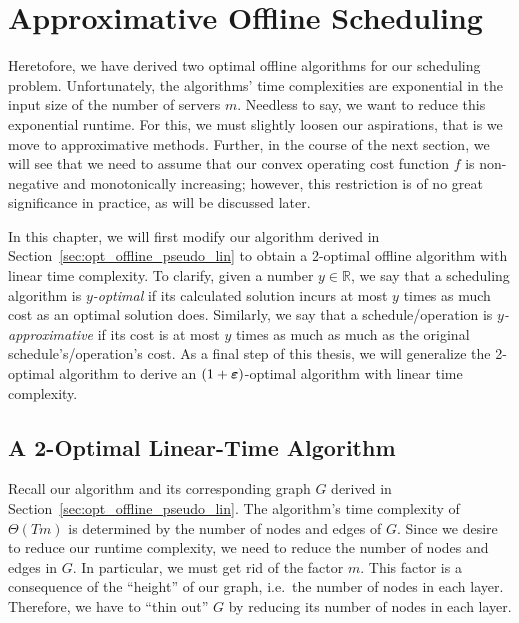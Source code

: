 
\chapter{Approximative Offline Scheduling}\label{chap:approx_offline_scheduling}
Heretofore, we have derived two optimal offline algorithms for our scheduling problem. Unfortunately, the algorithms' time complexities are exponential in the input size of the number of servers $m$. Needless to say, we want to reduce this exponential runtime. For this, we must slightly loosen our aspirations, that is we move to approximative methods. 
Further, in the course of the next section, we will see that we need to assume that our convex operating cost function $f$ is non-negative and monotonically increasing; however, this restriction is of no great significance in practice, as will be discussed later.

In this chapter, we will first modify our algorithm derived in Section~\ref{sec:opt_offline_pseudo_lin} to obtain a 2-optimal offline algorithm with linear time complexity. To clarify, given a number $y\in\mathbb{R}$, we say that a scheduling algorithm is \emph{$y$-optimal} if its calculated solution incurs at most $y$ times as much cost as an optimal solution does. Similarly, we say that a schedule/operation is \emph{$y$-approximative} if its cost is at most $y$ times as much as much as the original schedule's/operation's cost.
As a final step of this thesis, we will generalize the 2-optimal algorithm to derive an $(1+\boldsymbol\varepsilon)$-optimal algorithm with linear time complexity.

\section{A 2-Optimal Linear-Time Algorithm}\label{sec:approx_2_opt}
Recall our algorithm and its corresponding graph $G$ derived in Section~\ref{sec:opt_offline_pseudo_lin}. The algorithm's time complexity of $\Theta(Tm)$ is determined by the number of nodes and edges of $G$. Since we desire to reduce our runtime complexity, we need to reduce the number of nodes and edges in $G$. In particular, we must get rid of the factor $m$. This factor is a consequence of the ``height'' of our graph, i.e.\ the number of nodes in each layer. Therefore, we have to ``thin out'' $G$ by reducing its number of nodes in each layer.

